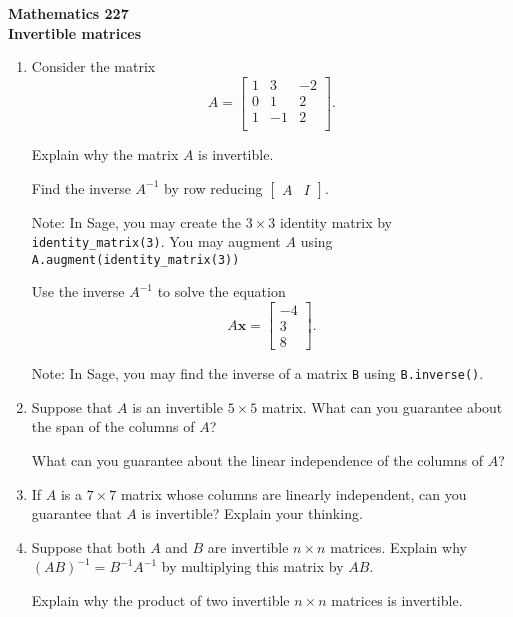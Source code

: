 \documentclass[12pt]{article}
\newcommand{\vs}[1]{\vspace{#1in}}
\newcommand{\xvec}{{\mathbf x}}
\newcommand{\threevec}[3]{\left[\begin{array}{r}#1 \\ #2 \\ #3
  \end{array}\right]}
\begin{document}
\noindent
{\bf Mathematics 227} \\ 
{\bf Invertible matrices}

\bigskip
\begin{enumerate}
\item Consider the matrix
  $$
  A =
  \left[
    \begin{array}{ccc}
      1 & 3 & -2 \\
      0 & 1 & 2 \\
      1 & -1 & 2 \\
    \end{array}
  \right].
  $$

  Explain why the matrix $A$ is invertible.

  \vs{1}
  Find the inverse $A^{-1}$ by 
  row reducing $\left[\begin{array}{c|c}A&I\end{array}\right]$.

  Note:  In Sage, you may create the $3\times3$ identity matrix by
  {\tt identity\_matrix(3)}.  You may augment
  $A$ using {\tt A.augment(identity\_matrix(3))}


  \vs{1.5}
  Use the inverse $A^{-1}$ to solve the equation
  $$
  A\xvec = \threevec{-4}38.
  $$
  
  Note: In Sage, you may find the inverse of a matrix 
  {\tt B} using {\tt B.inverse()}.

  \vs{1}
\item Suppose that $A$ is an invertible $5\times5$ matrix.  What can
  you guarantee about the span of the columns of $A$?

  \vs{1}
  \newpage
  What can you guarantee about the linear independence of the columns
  of $A$?

  \vs{1}
\item If $A$ is a $7\times7$ matrix whose columns are linearly
  independent, can you guarantee that $A$ is invertible?  Explain your
  thinking.  

  \vs{1}
\item Suppose that both $A$ and $B$ are invertible $n\times n$
  matrices.  Explain why $(AB)^{-1} = B^{-1}A^{-1}$ by multiplying
  this matrix by $AB$.

  \vs{1}
  Explain why the product of two invertible $n\times n$ matrices is
  invertible. 


\end{enumerate}
\end{document}
